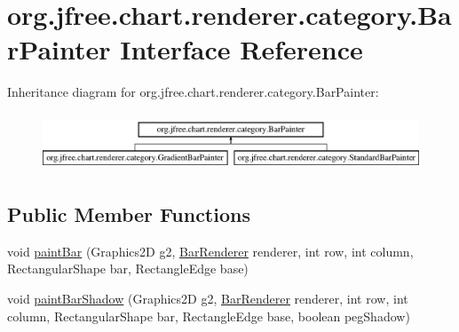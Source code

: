 \hypertarget{interfaceorg_1_1jfree_1_1chart_1_1renderer_1_1category_1_1_bar_painter}{}\section{org.\+jfree.\+chart.\+renderer.\+category.\+Bar\+Painter Interface Reference}
\label{interfaceorg_1_1jfree_1_1chart_1_1renderer_1_1category_1_1_bar_painter}
Inheritance diagram for org.\+jfree.\+chart.\+renderer.\+category.\+Bar\+Painter\+:\begin{figure}[H]
\begin{center}
\leavevmode
\includegraphics[height=1.723077cm]{interfaceorg_1_1jfree_1_1chart_1_1renderer_1_1category_1_1_bar_painter}
\end{center}
\end{figure}
\subsection*{Public Member Functions}
\begin{DoxyCompactItemize}
\item 
void \mbox{\hyperlink{interfaceorg_1_1jfree_1_1chart_1_1renderer_1_1category_1_1_bar_painter_af5a3c8984af0bc1a4ba94c830048193a}{paint\+Bar}} (Graphics2D g2, \mbox{\hyperlink{classorg_1_1jfree_1_1chart_1_1renderer_1_1category_1_1_bar_renderer}{Bar\+Renderer}} renderer, int row, int column, Rectangular\+Shape bar, Rectangle\+Edge base)
\item 
void \mbox{\hyperlink{interfaceorg_1_1jfree_1_1chart_1_1renderer_1_1category_1_1_bar_painter_a400718f4cbe3832397ec4ae6c7260d6a}{paint\+Bar\+Shadow}} (Graphics2D g2, \mbox{\hyperlink{classorg_1_1jfree_1_1chart_1_1renderer_1_1category_1_1_bar_renderer}{Bar\+Renderer}} renderer, int row, int column, Rectangular\+Shape bar, Rectangle\+Edge base, boolean peg\+Shadow)
\end{DoxyCompactItemize}


